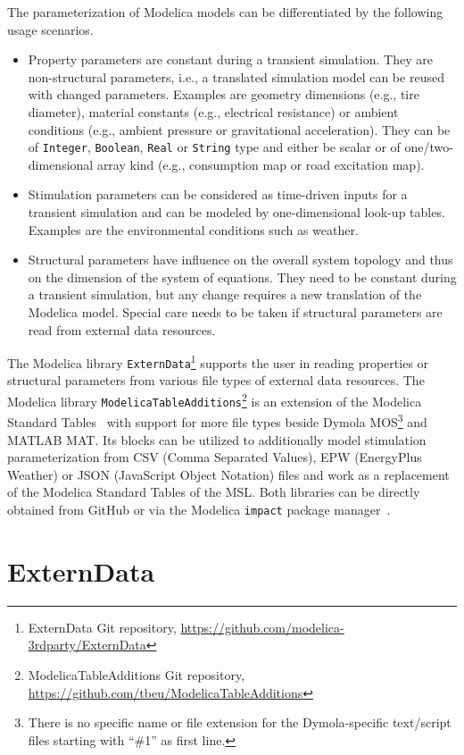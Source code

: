 \documentclass{modelica}
\newcommand{\modelica}[1]{\lstinline[language=modelica]|#1|}
\begin{document}
The parameterization of Modelica models can be differentiated by the following usage scenarios.
\begin{itemize}
 \item Property parameters are constant during a transient simulation. They are non-structural parameters, i.e., a translated simulation model can be reused with changed parameters. Examples are geometry dimensions (e.g., tire diameter), material constants (e.g., electrical resistance) or ambient conditions (e.g., ambient pressure or gravitational acceleration). They can be of \modelica{Integer}, \modelica{Boolean}, \modelica{Real} or \modelica{String} type and either be scalar or of one/two-dimensional array kind (e.g., consumption map or road excitation map).
 \item Stimulation parameters can be considered as time-driven inputs for a transient simulation and can be modeled by one-dimensional look-up tables. Examples are the environmental conditions such as weather.
 \item Structural parameters have influence on the overall system topology and thus on the dimension of the system of equations. They need to be constant during a transient simulation, but any change requires a new translation of the Modelica model. Special care needs to be taken if structural parameters are read from external data resources.
\end{itemize}

The Modelica library \modelica{ExternData}\footnote{ExternData Git repository, \url{https://github.com/modelica-3rdparty/ExternData}} supports the user in reading properties or structural parameters from various file types of external data resources.
The Modelica library \modelica{ModelicaTableAdditions}\footnote{ModelicaTableAdditions Git repository, \url{https://github.com/tbeu/ModelicaTableAdditions}} is an extension of the Modelica Standard Tables~\cite{modelica2014tables} with support for more file types beside Dymola MOS\footnote{There is no specific name or file extension for the Dymola-specific text/script files starting with ``\#1'' as first line.} and MATLAB MAT.
Its blocks can be utilized to additionally model stimulation parameterization from CSV (Comma Separated Values), EPW (EnergyPlus Weather) or JSON (JavaScript Object Notation) files and work as a replacement of the Modelica Standard Tables of the MSL.
Both libraries can be directly obtained from GitHub or via the Modelica \modelica{impact} package manager~\cite{Tiller2015WhereIG}.

\section{ExternData}
\end{document}
